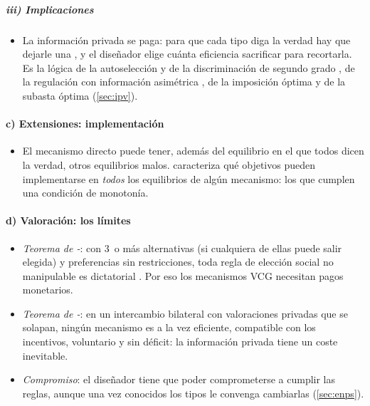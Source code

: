 \documentclass[11pt]{article}
\begin{document}
\subparagraph{iii) Implicaciones}

\begin{itemize}
\item La información privada se paga: para que cada tipo diga la verdad hay que dejarle una , y el diseñador elige cuánta eficiencia sacrificar para recortarla. Es la lógica de la autoselección y de la discriminación de segundo grado  , de la regulación con información asimétrica , de la imposición óptima  y de la subasta óptima (\ref{sec:ipv}).
\end{itemize}

\paragraph{c) Extensiones: implementación}

\begin{itemize}
\item El mecanismo directo puede tener, además del equilibrio en el que todos dicen la verdad, otros equilibrios malos. \textcite{Maskin1999Nash} caracteriza qué objetivos pueden implementarse en \emph{todos} los equilibrios de algún mecanismo: los que cumplen una condición de monotonía.
\end{itemize}

\paragraph{d) Valoración: los límites}

\begin{itemize}
\item \emph{Teorema de -}: con 3~o más alternativas (si cualquiera de ellas puede salir elegida) y preferencias sin restricciones, toda regla de elección social no manipulable es dictatorial\nocite{Gibbard1973Manipulation,Satterthwaite1975Strategy} . Por eso los mecanismos VCG necesitan pagos monetarios.
\item \emph{Teorema de -}: en un intercambio bilateral con valoraciones privadas que se solapan, ningún mecanismo es a la vez eficiente, compatible con los incentivos, voluntario y sin déficit\nocite{MyersonSatterthwaite1983Efficient}: la información privada tiene un coste inevitable.
\item \emph{Compromiso}: el diseñador tiene que poder comprometerse a cumplir las reglas, aunque una vez conocidos los tipos le convenga cambiarlas (\ref{sec:enps}).
\end{itemize}
\end{document}

